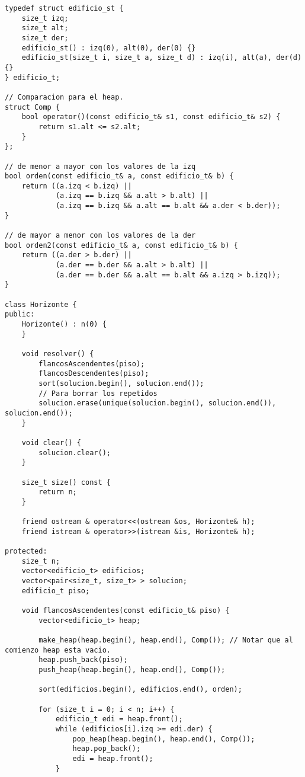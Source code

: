 \begin{frame}

\begin{lstlisting}
typedef struct edificio_st {
	size_t izq;
	size_t alt;
	size_t der;
	edificio_st() : izq(0), alt(0), der(0) {}
	edificio_st(size_t i, size_t a, size_t d) : izq(i), alt(a), der(d) {}
} edificio_t;

// Comparacion para el heap.
struct Comp {
	bool operator()(const edificio_t& s1, const edificio_t& s2) {
		return s1.alt <= s2.alt;
	}
};

// de menor a mayor con los valores de la izq
bool orden(const edificio_t& a, const edificio_t& b) {
	return ((a.izq < b.izq) ||
			(a.izq == b.izq && a.alt > b.alt) ||
			(a.izq == b.izq && a.alt == b.alt && a.der < b.der));
}

// de mayor a menor con los valores de la der
bool orden2(const edificio_t& a, const edificio_t& b) {
	return ((a.der > b.der) ||
			(a.der == b.der && a.alt > b.alt) ||
			(a.der == b.der && a.alt == b.alt && a.izq > b.izq));
}

class Horizonte {
public:
	Horizonte() : n(0) {
	}

	void resolver() {
		flancosAscendentes(piso);
		flancosDescendentes(piso);
		sort(solucion.begin(), solucion.end());
		// Para borrar los repetidos
		solucion.erase(unique(solucion.begin(), solucion.end()), solucion.end());    
	}

	void clear() {
		solucion.clear();
	}

	size_t size() const {
		return n;
	}

	friend ostream & operator<<(ostream &os, Horizonte& h);
	friend istream & operator>>(istream &is, Horizonte& h);

protected:
	size_t n;
	vector<edificio_t> edificios;
	vector<pair<size_t, size_t> > solucion;
	edificio_t piso;

	void flancosAscendentes(const edificio_t& piso) {
		vector<edificio_t> heap;

		make_heap(heap.begin(), heap.end(), Comp()); // Notar que al comienzo heap esta vacio.
		heap.push_back(piso);
		push_heap(heap.begin(), heap.end(), Comp());

		sort(edificios.begin(), edificios.end(), orden);

		for (size_t i = 0; i < n; i++) {
			edificio_t edi = heap.front();
			while (edificios[i].izq >= edi.der) {
				pop_heap(heap.begin(), heap.end(), Comp());
				heap.pop_back();
				edi = heap.front();
			}


\end{lstlisting}
\end{frame}
